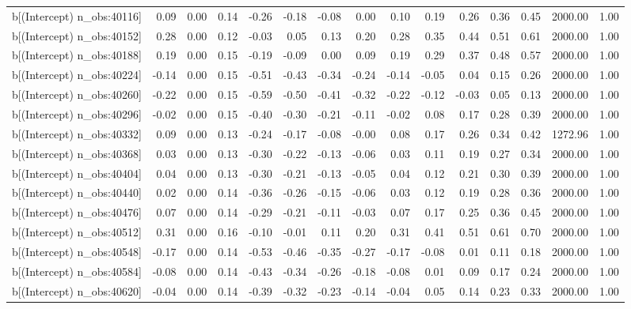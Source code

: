 \begin{table}[ht]
\begin{tabular}{rrrrrrrrrrrrrrr}
  b[(Intercept) n\_obs:40116] & 0.09 & 0.00 & 0.14 & -0.26 & -0.18 & -0.08 & 0.00 & 0.10 & 0.19 & 0.26 & 0.36 & 0.45 & 2000.00 & 1.00 \\ 
  b[(Intercept) n\_obs:40152] & 0.28 & 0.00 & 0.12 & -0.03 & 0.05 & 0.13 & 0.20 & 0.28 & 0.35 & 0.44 & 0.51 & 0.61 & 2000.00 & 1.00 \\ 
  b[(Intercept) n\_obs:40188] & 0.19 & 0.00 & 0.15 & -0.19 & -0.09 & 0.00 & 0.09 & 0.19 & 0.29 & 0.37 & 0.48 & 0.57 & 2000.00 & 1.00 \\ 
  b[(Intercept) n\_obs:40224] & -0.14 & 0.00 & 0.15 & -0.51 & -0.43 & -0.34 & -0.24 & -0.14 & -0.05 & 0.04 & 0.15 & 0.26 & 2000.00 & 1.00 \\ 
  b[(Intercept) n\_obs:40260] & -0.22 & 0.00 & 0.15 & -0.59 & -0.50 & -0.41 & -0.32 & -0.22 & -0.12 & -0.03 & 0.05 & 0.13 & 2000.00 & 1.00 \\ 
  b[(Intercept) n\_obs:40296] & -0.02 & 0.00 & 0.15 & -0.40 & -0.30 & -0.21 & -0.11 & -0.02 & 0.08 & 0.17 & 0.28 & 0.39 & 2000.00 & 1.00 \\ 
  b[(Intercept) n\_obs:40332] & 0.09 & 0.00 & 0.13 & -0.24 & -0.17 & -0.08 & -0.00 & 0.08 & 0.17 & 0.26 & 0.34 & 0.42 & 1272.96 & 1.00 \\ 
  b[(Intercept) n\_obs:40368] & 0.03 & 0.00 & 0.13 & -0.30 & -0.22 & -0.13 & -0.06 & 0.03 & 0.11 & 0.19 & 0.27 & 0.34 & 2000.00 & 1.00 \\ 
  b[(Intercept) n\_obs:40404] & 0.04 & 0.00 & 0.13 & -0.30 & -0.21 & -0.13 & -0.05 & 0.04 & 0.12 & 0.21 & 0.30 & 0.39 & 2000.00 & 1.00 \\ 
  b[(Intercept) n\_obs:40440] & 0.02 & 0.00 & 0.14 & -0.36 & -0.26 & -0.15 & -0.06 & 0.03 & 0.12 & 0.19 & 0.28 & 0.36 & 2000.00 & 1.00 \\ 
  b[(Intercept) n\_obs:40476] & 0.07 & 0.00 & 0.14 & -0.29 & -0.21 & -0.11 & -0.03 & 0.07 & 0.17 & 0.25 & 0.36 & 0.45 & 2000.00 & 1.00 \\ 
  b[(Intercept) n\_obs:40512] & 0.31 & 0.00 & 0.16 & -0.10 & -0.01 & 0.11 & 0.20 & 0.31 & 0.41 & 0.51 & 0.61 & 0.70 & 2000.00 & 1.00 \\ 
  b[(Intercept) n\_obs:40548] & -0.17 & 0.00 & 0.14 & -0.53 & -0.46 & -0.35 & -0.27 & -0.17 & -0.08 & 0.01 & 0.11 & 0.18 & 2000.00 & 1.00 \\ 
  b[(Intercept) n\_obs:40584] & -0.08 & 0.00 & 0.14 & -0.43 & -0.34 & -0.26 & -0.18 & -0.08 & 0.01 & 0.09 & 0.17 & 0.24 & 2000.00 & 1.00 \\ 
  b[(Intercept) n\_obs:40620] & -0.04 & 0.00 & 0.14 & -0.39 & -0.32 & -0.23 & -0.14 & -0.04 & 0.05 & 0.14 & 0.23 & 0.33 & 2000.00 & 1.00 \\ 

\end{tabular}
\end{table}
